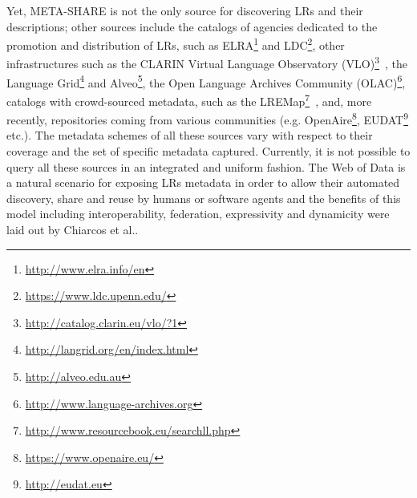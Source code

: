 \documentclass{llncs}
\begin{document}
Yet, META-SHARE is not the only source for discovering LRs and their descriptions; other sources include the catalogs of agencies dedicated to the promotion and distribution of LRs, such as ELRA\footnote{\url{http://www.elra.info/en}} and LDC\footnote{\url{https://www.ldc.upenn.edu/}}, other infrastructures such as the CLARIN Virtual Language Observatory (VLO)\footnote{\url{http://catalog.clarin.eu/vlo/?1}}~\cite{broeder2010data}, 
the Language Grid\footnote{\url{http://langrid.org/en/index.html}} and Alveo\footnote{\url{http://alveo.edu.au}}, the Open Language Archives Community (OLAC)\footnote{\url{http://www.language-archives.org}}, 
catalogs with crowd-sourced metadata, such as the LREMap\footnote{\url{http://www.resourcebook.eu/searchll.php}}~\cite{calzolari2012lre}, and, more recently, repositories coming from various communities (e.g. OpenAire\footnote{\url{https://www.openaire.eu/}}, EUDAT\footnote{\url{http://eudat.eu}} etc.). 
The metadata schemes of all these sources vary with respect to their coverage and the set of specific metadata captured.
Currently, it is not possible to query all these sources in an integrated and uniform fashion.
The Web of Data is a natural scenario for exposing LRs metadata in order to allow their automated discovery, share and reuse by humans or software agents and the benefits of this model including interoperability, federation, expressivity and dynamicity were laid out by Chiarcos et al.\cite{chiarcos2012towards}.
\end{document}
